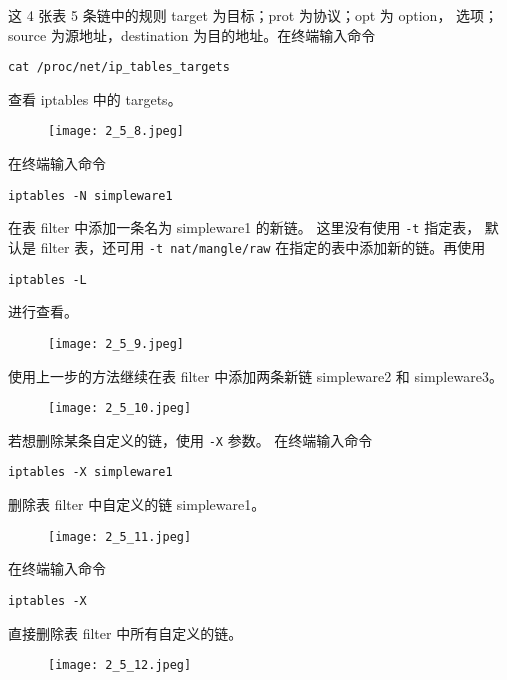 这 4 张表 5 条链中的规则 target 为目标；prot 为协议；opt 为 option，
选项；source 为源地址，destination 为目的地址。在终端输入命令
\begin{verbatim}
cat /proc/net/ip_tables_targets
\end{verbatim}
查看 iptables 中的 targets。
\begin{figure}[H]
  \begin{center}
    \texttt{[image: 2\_5\_8.jpeg]}
  \end{center}
\end{figure}

在终端输入命令
\begin{verbatim}
iptables -N simpleware1
\end{verbatim}
在表 filter 中添加一条名为 simpleware1 的新链。
这里没有使用 \texttt{-t} 指定表，
默认是 filter 表，还可用 \texttt{-t nat/mangle/raw}
在指定的表中添加新的链。再使用
\begin{verbatim}
iptables -L
\end{verbatim}
进行查看。
\begin{figure}[H]
  \begin{center}
    \texttt{[image: 2\_5\_9.jpeg]}
  \end{center}
\end{figure}

使用上一步的方法继续在表 filter 中添加两条新链
simpleware2 和 simpleware3。
\begin{figure}[H]
  \begin{center}
    \texttt{[image: 2\_5\_10.jpeg]}
  \end{center}
\end{figure}

若想删除某条自定义的链，使用 \texttt{-X} 参数。
在终端输入命令
\begin{verbatim}
iptables -X simpleware1
\end{verbatim}
删除表 filter 中自定义的链 simpleware1。
\begin{figure}[H]
  \begin{center}
    \texttt{[image: 2\_5\_11.jpeg]}
  \end{center}
\end{figure}

在终端输入命令
\begin{verbatim}
iptables -X
\end{verbatim}
直接删除表 filter 中所有自定义的链。
\begin{figure}[H]
  \begin{center}
    \texttt{[image: 2\_5\_12.jpeg]}
  \end{center}
\end{figure}

